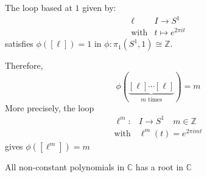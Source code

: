 \begin{remark}
The loop based at $1$ given by:
\[
\begin{array}{ll}
\ell&I\to S^1\\\text{with}&t\mapsto e^{2\pi i t}
\end{array}
\]
satisfies $\phi([\ell])=1$ in $\phi:\pi_1(S^1,1)\cong\mathbb{Z}$.

Therefore,
\[
\phi(\underbrace{[\ell]\cdots[\ell]}_{\text{$m$ times}})=m
\]
More precisely, the loop
\[
\begin{array}{ll}
\ell^m:&I\to S^1\quad m\in\mathbb{Z}\\
\text{with}&\ell^m(t) = e^{2\pi imt}
\end{array}
\]
gives $\phi([\ell^m])=m$
\end{remark}

\begin{corollary}
All non-constant polynomials in $\mathbb{C}$ has a root in $\mathbb{C}$
\end{corollary}

